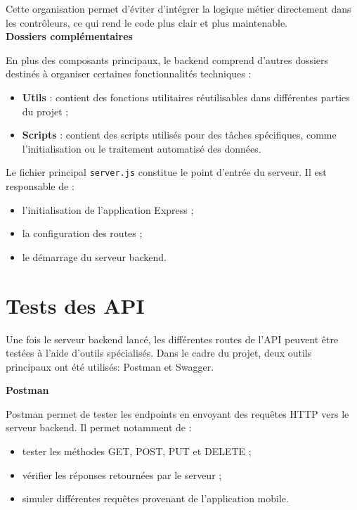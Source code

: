 \noindent Cette organisation permet d’éviter d’intégrer la logique métier directement dans les contrôleurs, ce qui rend le code plus clair et plus maintenable.\\

\noindent \textbf{Dossiers complémentaires}  

\noindent En plus des composants principaux, le backend comprend d’autres dossiers destinés à organiser certaines fonctionnalités techniques :
\begin{itemize}
\item \textbf{Utils} : contient des fonctions utilitaires réutilisables dans différentes parties du projet ;
\item \textbf{Scripts} : contient des scripts utilisés pour des tâches spécifiques, comme l’initialisation ou le traitement automatisé des données.
\end{itemize}

\noindent Le fichier principal \texttt{server.js} constitue le point d’entrée du serveur. Il est responsable de :
\begin{itemize}
\item l’initialisation de l’application Express ;
\item la configuration des routes ;
\item le démarrage du serveur backend.
\end{itemize}


\section{Tests des API}

\noindent Une fois le serveur backend lancé, les différentes routes de l’API peuvent être testées à l’aide d’outils spécialisés. Dans le cadre du projet, deux outils principaux ont été utilisés: Postman et Swagger.

\noindent \textbf{Postman}  

\noindent Postman permet de tester les endpoints en envoyant des requêtes HTTP vers le serveur backend. Il permet notamment de :
\begin{itemize}
\item tester les méthodes GET, POST, PUT et DELETE ;
\item vérifier les réponses retournées par le serveur ;
\item simuler différentes requêtes provenant de l’application mobile.
\end{itemize}

